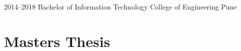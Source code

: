     \cventry
        {2014--2018}
        {Bachelor of Information Technology}
        {College of Engineering}
        {Pune}
        {}
        {
        }

\section{Masters Thesis}

